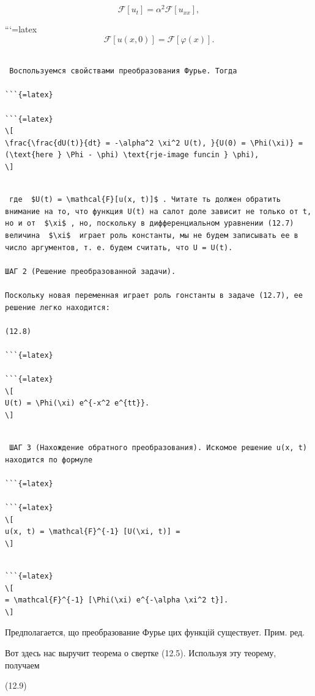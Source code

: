 \documentclass[
  ukrainian,
]{article}
\begin{document}
\[
\mathcal{F}[u_t] = \alpha^2 \mathcal{F}[u_{xx}],
\]

```{=latex}
\[
\mathcal{F}[u(x, 0)] = \mathcal{F}[\varphi(x)].
\]

\begin{verbatim}

 Воспользуемся свойствами преобразования Фурье. Тогда

```{=latex}

```{=latex}
\[
\frac{\frac{dU(t)}{dt} = -\alpha^2 \xi^2 U(t), }{U(0) = \Phi(\xi)} = (\text{here } \Phi - \phi) \text{rje-image funcin } \phi),
\]
\end{verbatim}

\begin{verbatim}

 где  $U(t) = \mathcal{F}[u(x, t)]$ . Читате ть должен обратить внимание на то, что функция U(t) на салот доле зависит не только от t, но и от  $\xi$ , но, поскольку в дифференциальном уравнении (12.7) величина  $\xi$  играет роль константы, мы не будем записывать ее в число аргументов, т. е. будем считать, что U = U(t).

ШАГ 2 (Решение преобразованной задачи).

Поскольку новая переменная играет роль гонстанты в задаче (12.7), ее решение легко находится:

(12.8) 

```{=latex}

```{=latex}
\[
U(t) = \Phi(\xi) e^{-x^2 e^{tt}}.
\]
\end{verbatim}

\begin{verbatim}

 ШАГ 3 (Нахождение обратного преобразования). Искомое решение u(x, t) находится по формуле

```{=latex}

```{=latex}
\[
u(x, t) = \mathcal{F}^{-1} [U(\xi, t)] =
\]
\end{verbatim}

\begin{verbatim}

```{=latex}
\[
= \mathcal{F}^{-1} [\Phi(\xi) e^{-\alpha \xi^2 t}].
\]
\end{verbatim}

Предполагается, що преобразование Фурье цих функцій существует. Прим.
ред.

Вот здесь нас выручит теорема о свертке (12.5). Используя эту теорему,
получаем

(12.9)
\end{document}
